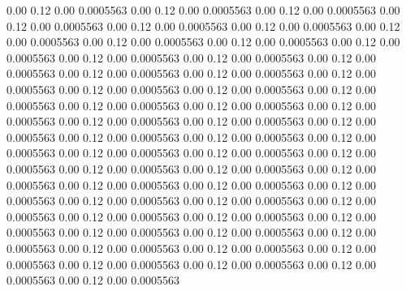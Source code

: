    0.00    0.12    0.00   0.0005563
   0.00    0.12    0.00   0.0005563
   0.00    0.12    0.00   0.0005563
   0.00    0.12    0.00   0.0005563
   0.00    0.12    0.00   0.0005563
   0.00    0.12    0.00   0.0005563
   0.00    0.12    0.00   0.0005563
   0.00    0.12    0.00   0.0005563
   0.00    0.12    0.00   0.0005563
   0.00    0.12    0.00   0.0005563
   0.00    0.12    0.00   0.0005563
   0.00    0.12    0.00   0.0005563
   0.00    0.12    0.00   0.0005563
   0.00    0.12    0.00   0.0005563
   0.00    0.12    0.00   0.0005563
   0.00    0.12    0.00   0.0005563
   0.00    0.12    0.00   0.0005563
   0.00    0.12    0.00   0.0005563
   0.00    0.12    0.00   0.0005563
   0.00    0.12    0.00   0.0005563
   0.00    0.12    0.00   0.0005563
   0.00    0.12    0.00   0.0005563
   0.00    0.12    0.00   0.0005563
   0.00    0.12    0.00   0.0005563
   0.00    0.12    0.00   0.0005563
   0.00    0.12    0.00   0.0005563
   0.00    0.12    0.00   0.0005563
   0.00    0.12    0.00   0.0005563
   0.00    0.12    0.00   0.0005563
   0.00    0.12    0.00   0.0005563
   0.00    0.12    0.00   0.0005563
   0.00    0.12    0.00   0.0005563
   0.00    0.12    0.00   0.0005563
   0.00    0.12    0.00   0.0005563
   0.00    0.12    0.00   0.0005563
   0.00    0.12    0.00   0.0005563
   0.00    0.12    0.00   0.0005563
   0.00    0.12    0.00   0.0005563
   0.00    0.12    0.00   0.0005563
   0.00    0.12    0.00   0.0005563
   0.00    0.12    0.00   0.0005563
   0.00    0.12    0.00   0.0005563
   0.00    0.12    0.00   0.0005563
   0.00    0.12    0.00   0.0005563
   0.00    0.12    0.00   0.0005563
   0.00    0.12    0.00   0.0005563
   0.00    0.12    0.00   0.0005563
   0.00    0.12    0.00   0.0005563
   0.00    0.12    0.00   0.0005563
   0.00    0.12    0.00   0.0005563
   0.00    0.12    0.00   0.0005563
   0.00    0.12    0.00   0.0005563
   0.00    0.12    0.00   0.0005563
